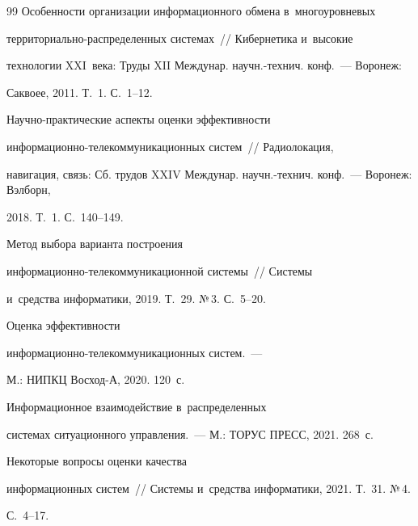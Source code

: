 {{\begin{thebibliography}{99}
 Особенности организации информационного обмена в~многоуровневых  


тер\-ри\-то\-ри\-аль\-но-рас\-пре\-де\-лен\-ных сис\-те\-мах~/\!\!/ Кибернетика и~высокие 


технологии XXI~века: Труды XII Междунар. научн.-технич. конф.~--- Воронеж: 


Саквоее, 2011. Т.~1. С.~1--12.




 Научно-практические аспекты оценки эффективности  


ин\-фор\-ма\-ци\-он\-но-те\-ле\-ком\-му\-ни\-ка\-ци\-он\-ных сис\-тем~/\!\!/ Радиолокация, 


навигация, связь: Сб. трудов XXIV Междунар. научн.-технич. конф.~--- Воронеж: Вэлборн, 


2018. Т.~1. С.~140--149. 




 Метод выбора варианта построения  


ин\-фор\-ма\-ци\-он\-но-те\-ле\-ком\-му\-ни\-ка\-ци\-он\-ной сис\-те\-мы~/\!\!/ Сис\-те\-мы 


и~средства информатики, 2019. Т.~29. №\,3. С.~5--20. 




 Оценка эффективности  


ин\-фор\-ма\-ци\-он\-но-те\-ле\-ком\-му\-ни\-ка\-ци\-он\-ных сис\-тем.~---  


М.: НИПКЦ Восход-А, 2020. 120~с.







 Информационное взаимодействие в~распределенных 


сис\-те\-мах ситуационного управ\-ле\-ния.~--- М.: ТОРУС ПРЕСС, 2021. 268~с.







 Некоторые вопросы оценки качества 


информационных сис\-тем~/\!\!/ Сис\-те\-мы и~средства информатики, 2021. Т.~31. №\,4. 


С.~4--17.














 \end{thebibliography}


} }












